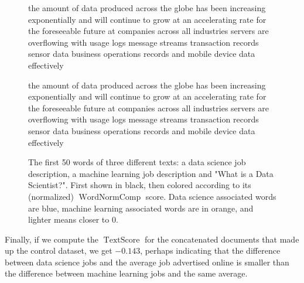 \documentclass[12pt]{article}
\DeclareMathOperator{\WNp}{WordNormComp}
\DeclareMathOperator{\TS}{TextScore}
\begin{document}
\begin{figure}[h]
the amount of data produced across the globe has been increasing
exponentially and will continue to grow at an accelerating rate for the foreseeable future at companies across all industries servers are overflowing with usage logs message streams transaction records sensor data business operations records and mobile device data effectively

{\color{b1}the} {\color{o2}amount} {\color{w}of} {\color{b1}data} {\color{o1}produced} {\color{b1}across} {\color{b1}the} {\color{b1}globe} {\color{b1}has} {\color{b2}been} {\color{o1}increasing} {\color{o1}exponentially} {\color{w}and} {\color{w}will} {\color{o1}continue} {\color{w}to} {\color{b1}grow} {\color{w}at} {\color{w}an} {\color{o1}accelerating} {\color{o4}rate} {\color{w}for} {\color{b1}the} {\color{o1}foreseeable} {\color{b1}future} {\color{w}at} {\color{b2}companies} {\color{b1}across} {\color{b1}all} {\color{o1}industries} {\color{o1}servers} {\color{w}are} {\color{o1}overflowing} {\color{w}with} {\color{b1}usage} {\color{o1}logs} {\color{o3}message} {\color{o2}streams} {\color{w}transaction} {\color{o1}records} {\color{o1}sensor} {\color{b1}data} {\color{b2}business} {\color{b3}operations} {\color{o1}records} {\color{w}and} {\color{o1}mobile} {\color{o1}device} {\color{b1}data} {\color{w}effectively}

\caption{\label{fig:TextColored} The first 50 words of three different texts: a data science job description, a machine learning job description and "What is a Data Scientist?". First shown in black, then colored according to its (normalized) $\WNp$ score. Data science associated words are blue, machine learning associated words are in orange, and lighter means closer to 0.}
\end{figure}

Finally, if we compute the $\TS$ for the concatenated documents that made up the control dataset, we get $-0.143$, perhaps indicating that the difference between data science jobs and the average job advertised online is smaller than the difference between machine learning jobs and the same average. 

\clearpage




\end{document}
